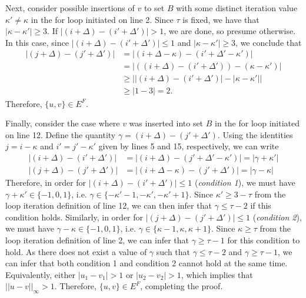 \documentclass[opre,nonblindrev]{informs3} %
\begin{document}
{Next, consider possible insertions of $v$ to set $B$ with some distinct iteration value $\kappa' \neq \kappa$ in the for loop initiated on line 2. Since $\tau$ is fixed, we have that $|\kappa-\kappa'| \geq 3$. If $|(i+\Delta)-(i'+\Delta')| > 1$, we are done, so presume otherwise. In this case, since $|(i+\Delta)-(i'+\Delta')| \leq 1$ and $|\kappa-\kappa'| \geq 3$, we conclude that 
\begin{align*}
    |(j+\Delta)-(j'+\Delta')| &= |(i+\Delta-\kappa) - (i'+\Delta'-\kappa')| \\
    &= |((i+\Delta)-(i'+\Delta')) - (\kappa-\kappa')| \\
    &\geq \left||(i+\Delta)-(i'+\Delta')| - |\kappa-\kappa'|\right| \\
    &\geq |1 - 3| = 2.
\end{align*}
Therefore, $\{u,v\} \in E^F$.

Finally, consider the case where $v$ was inserted into set $B$ in the for loop initiated on line 12. Define the quantity $\gamma = (i+\Delta) - (j' + \Delta')$. Using the identities $j=i-\kappa$ and $i'=j'-\kappa'$ given by lines 5 and 15, respectively, we can write
\begin{subequations}
\begin{align}
    |(i+\Delta)-(i'+\Delta')| &= |(i+\Delta) - (j'+\Delta'-\kappa')| = |\gamma + \kappa'| \label{eqn:first-component} \\
    |(j+\Delta)-(j'+\Delta')| &= |(i+\Delta - \kappa) - (j' + \Delta')| = |\gamma - \kappa| \label{eqn:second-component}
\end{align}
\end{subequations}
Therefore, in order for $|(i+\Delta)-(i'+\Delta')| \leq 1$ (\emph{condition 1}), we must have $\gamma + \kappa' \in \{-1,0,1\}$, i.e. $\gamma \in \{-\kappa'-1,-\kappa',-\kappa'+1\}$. Since $\kappa' \geq 3-\tau$ from the loop iteration definition of line 12, we can then infer that $\gamma \leq \tau - 2$ if this condition holds. Similarly, in order for $|(j+\Delta)-(j'+\Delta')| \leq 1$ (\emph{condition 2}), we must have $\gamma - \kappa \in \{-1,0,1\}$, i.e. $\gamma \in \{\kappa-1,\kappa,\kappa+1\}$. Since $\kappa \geq \tau$ from the loop iteration definition of line 2, we can infer that $\gamma \geq \tau-1$ for this condition to hold. As there does not exist a value of $\gamma$ such that $\gamma \leq \tau - 2$ and $\gamma \geq \tau - 1$, we can infer that both condition 1 and condition 2 cannot hold at the same time. Equivalently, either $|u_1-v_1| > 1$ or $|u_2-v_2| > 1$, which implies that $||u-v||_\infty > 1$. Therefore, $\{u,v\} \in E^F$, completing the proof.
\Halmos\endproof

}
\end{document}
